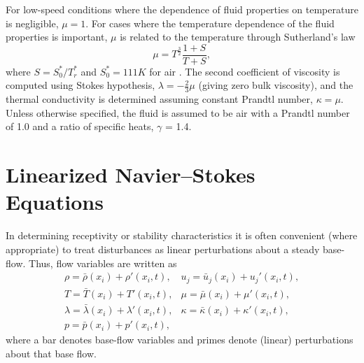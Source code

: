 For low-speed conditions where the dependence of fluid properties on
temperature is negligible, $\mu=1$.  For cases where the temperature
dependence of the fluid properties is important, $\mu$ is related to the
temperature through Sutherland's law
%
  \begin{equation} \label{e:mu}
    \mu = T^{\frac{3}{2}} \frac{1 + S}{T + S} ,
  \end{equation}
%
where $S = S_0^* / {T^*_r}$ and $S_0^* = 111 K$ for air
\cite{White:91}. The second coefficient of viscosity is computed using Stokes
hypothesis, $\lambda= -\frac{2}{3} \mu$ (giving zero bulk viscosity), and the
thermal conductivity is determined assuming constant Prandtl number,
$\kappa=\mu$.  Unless otherwise specified, the fluid is assumed to be air with
a Prandtl number of 1.0 and a ratio of specific heats, $\gamma$ = 1.4.

\section{Linearized Navier--Stokes Equations \label{s:linNS}}

In determining receptivity or stability characteristics it is often convenient
(where appropriate) to treat disturbances as linear perturbations about a
steady base-flow.  Thus, flow variables are written as
%
\begin{equation}
  \begin{array}{ll}
    \rho    = \bar \rho(x_i)    + \rho'(x_i,t) ,    &
    u_j     = \bar u_j(x_i)     + u_j'(x_i,t) ,     \\
    T       = \bar T(x_i)       + T'(x_i,t) ,       &
    \mu     = \bar \mu(x_i)     + \mu'(x_i,t) ,     \\
    \lambda = \bar \lambda(x_i) + \lambda'(x_i,t) , &
    \kappa  = \bar \kappa(x_i)  + \kappa'(x_i,t) ,  \\
    p       = \bar p(x_i)       + p'(x_i,t) ,       &
    ~
  \end{array}
\end{equation}
%
where a bar denotes base-flow variables and primes denote (linear)
perturbations about that base flow.

